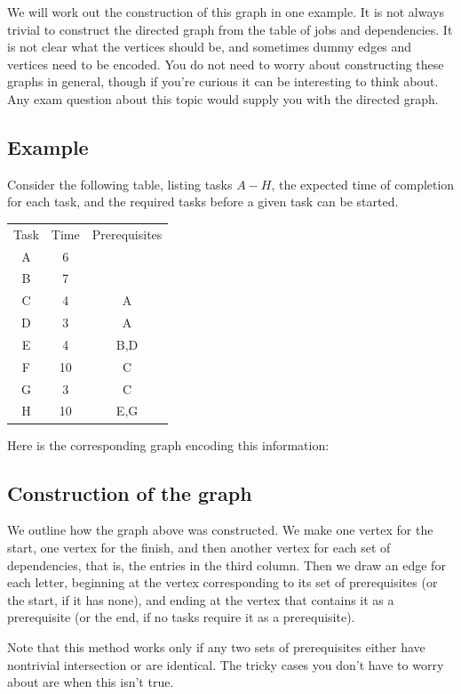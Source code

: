 \documentclass[]{article}
\begin{document}
We will work out the construction of this graph in one example. It is
not always trivial to construct the directed graph from the table of
jobs and dependencies. It is not clear what the vertices should be, and
sometimes dummy edges and vertices need to be encoded. You do not need
to worry about constructing these graphs in general, though if you're
curious it can be interesting to think about. Any exam question about
this topic would supply you with the directed graph.

\subsection{Example}\label{example-6}

Consider the following table, listing tasks \(A-H\), the expected time
of completion for each task, and the required tasks before a given task
can be started.

\begin{tabular}{ccc}
Task & Time & Prerequisites \\
A & 6 & \\
B & 7 & \\
C & 4 & A \\
D & 3 & A \\
E & 4 & B,D \\
F & 10 & C \\
G & 3 & C \\
H & 10 & E,G 
\end{tabular}

Here is the corresponding graph encoding this information:

\subsection{Construction of the graph}\label{construction-of-the-graph}

We outline how the graph above was constructed. We make one vertex for
the start, one vertex for the finish, and then another vertex for each
set of dependencies, that is, the entries in the third column. Then we
draw an edge for each letter, beginning at the vertex corresponding to
its set of prerequisites (or the start, if it has none), and ending at
the vertex that contains it as a prerequisite (or the end, if no tasks
require it as a prerequisite).

Note that this method works only if any two sets of prerequisites either
have nontrivial intersection or are identical. The tricky cases you
don't have to worry about are when this isn't true.
\end{document}
